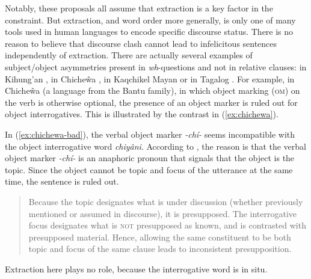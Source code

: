 
Notably, these proposals all assume that extraction is a key factor in the constraint. But extraction, and word order more generally, is only one of many tools used in human languages to encode specific discourse status. There is no reason to believe that discourse clash cannot lead to infelicitous sentences independently of extraction.
There are actually several examples of subject/object asymmetries present in \textit{wh}-questions and not in relative clauses: in Kihung’an \citet{Takizala.1973}, in Chiche\^wa \citep{Bresnan.1987}, in Kaqchikel Mayan \citep{Heaton.2016} or in Tagalog \citet{PizarroGuevara.2020}. For example, in Chiche\^wa (a language from the Bantu family), in which object marking (\textsc{om}) on the verb is otherwise optional, the presence of an object marker is ruled out for object interrogatives. This is illustrated by the contrast in (\ref{ex:chichewa}). 

\begin{exe}
\ex \citep[759--760]{Bresnan.1987}
\label{ex:chichewa}
\begin{xlist}
\label{ex:chichewa-bad}
\end{xlist}
\end{exe}

In (\ref{ex:chichewa-bad}), the verbal object marker \emph{-chí-} seems incompatible with the object interrogative word \emph{chiyâni}. According to \citet[758--760]{Bresnan.1987}, the reason is that the verbal object marker \emph{-chí-} is an anaphoric pronoun that signals that the object is the topic. Since the object cannot be topic and focus of the utterance at the same time, the sentence is ruled out.
\begin{quote}
    Because the topic designates what is under discussion (whether previously mentioned or assumed in discourse), it is presupposed. The interrogative focus designates what is \textsc{not} presupposed as known, and is contrasted with presupposed material. Hence, allowing the same constituent to be both topic and focus of the same clause leads to inconsistent presupposition. \citep[758]{Bresnan.1987}
\end{quote}
Extraction here plays no role, because the interrogative word is in situ.

